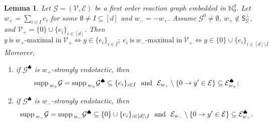 \documentclass[10pt]{amsart}
\numberwithin{equation}{section}
\theoremstyle{plain}
\newtheorem{lemma}[theorem]{Lemma}
\theoremstyle{definition}
\theoremstyle{remark}
\newcommand{\cE}{\mathcal{E}}
\newcommand{\cG}{\mathcal{G}}
\newcommand{\cI}{I}
\newcommand{\cV}{\mathcal{V}}
\newcommand{\supp}{{\rm supp\,}}
\begin{document}
\begin{lemma}\label{le:A-endotactic}
Let $\cG=(\cV,\cE)$ be a first order reaction graph embedded in $\mathbb{N}^d_0$.  Let $w_+=\sum_{i\in \cI}e_i$ for some $\emptyset\neq\cI\subseteq[d]$ and $w_-=-w_+$. Assume $\cG^0\neq\emptyset$, $w_+\notin\mathsf{S}_{\cG}^{\perp}$, and $\cV_+=\{0\}\cup\{e_i\}_{i\in[d]}$. Then
\begin{equation}\label{eq:maximality-condition}
y\ \text{is}\ w_+\text{-maximal in}\ \cV_+ \Leftrightarrow y\in\{e_i\}_{i\in\cI};\ e_i\ \text{is}\ w_-\text{-maximal in}\ \cV_+ \Leftrightarrow y\in\{0\}\cup\{e_i\}_{i\in[d]\setminus\cI}
\end{equation}
Moreover,
\begin{enumerate}
\item[(i)] if $\cG^{\spadesuit}$ is $w_+$-strongly endotactic, then  $$\supp_{w_+}\cG=\supp_{w_+}\cG^{\spadesuit}\subseteq\{e_i\}_{i\in\cI}\ \ \text{and}\ \ \cE_{w_+}\setminus\{0\to y'\in\cE\}\subseteq \cE^{\spadesuit}_{w_+};$$
\item[(ii)] if $\cG^{\spadesuit}$ is $w_-$-strongly endotactic, then $$\supp_{w_-}\cG=\supp_{w_-}\cG^{\spadesuit}\subseteq\{0\}\cup\{e_i\}_{i\in[d]\setminus\cI}\ \ \text{and}\ \ \cE_{w_-}\setminus\{0\to y'\in\cE\}\subseteq \cE^{\spadesuit}_{w_-}.$$
\end{enumerate}
\end{lemma}
\end{document}
